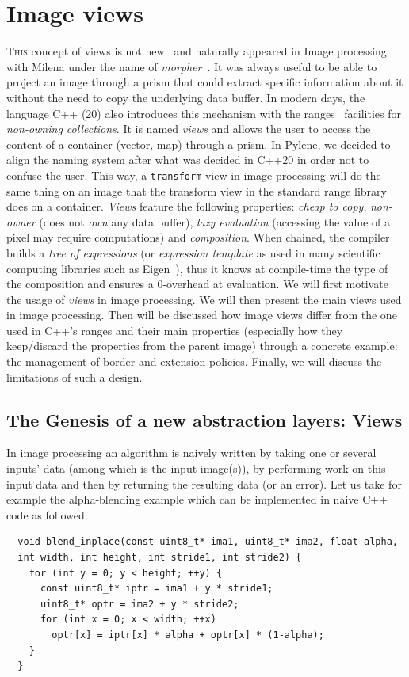 \chapter{Image views}
\label{chap:image_views}

\lettrine[lines=2]{T}{his} concept of views is not new~\parencite{novak.1997.reuse} and naturally appeared in Image
processing with Milena under the name of \emph{morpher}~\parencite{levillain.2009.ismm,geraud.2012.hdr}. It was always
useful to be able to project an image through a prism that could extract specific information about it without the need
to copy the underlying data buffer. In modern days, the language C++ (20) also introduces this mechanism with the
ranges~\parencite{niebler.2014.ranges} facilities for \emph{non-owning collections}. It is named \emph{views} and allows
the user to access the content of a container (vector, map) through a prism. In Pylene, we decided to align the naming
system after what was decided in C++20 in order not to confuse the user. This way, a \texttt{transform} view in image
processing will do the same thing on an image that the transform view in the standard range library does on a container.
\emph{Views} feature the following properties: \emph{cheap to copy}, \emph{non-owner} (does not \emph{own} any data
buffer), \emph{lazy evaluation} (accessing the value of a pixel may require computations) and \emph{composition}. When
chained, the compiler builds a \emph{tree of expressions} (or \emph{expression template} as used in many scientific
computing libraries such as Eigen~\parencite{guennebaud.2010.eigen}), thus it knows at compile-time the type of the
composition and ensures a 0-overhead at evaluation. We will first motivate the usage of \emph{views} in image
processing. We will then present the main views used in image processing. Then will be discussed how image views differ
from the one used in C++'s ranges and their main properties (especially how they keep/discard the properties from the
parent image) through a concrete example: the management of border and extension policies. Finally, we will discuss the
limitations of such a design.

\section{The Genesis of a new abstraction layers: Views}
\label{sec:genesis_of_views}

In image processing an algorithm is naively written by taking one or several inputs' data (among which is the input
image(s)),  by performing work on this input data and then by returning the resulting data (or an error). Let us take
for example the alpha-blending example which can be implemented in naive C++ code as followed:
\begin{verbatim}
  void blend_inplace(const uint8_t* ima1, uint8_t* ima2, float alpha,
  int width, int height, int stride1, int stride2) {
    for (int y = 0; y < height; ++y) {
      const uint8_t* iptr = ima1 + y * stride1;
      uint8_t* optr = ima2 + y * stride2;
      for (int x = 0; x < width; ++x)
        optr[x] = iptr[x] * alpha + optr[x] * (1-alpha);
    }
  }
\end{verbatim}

